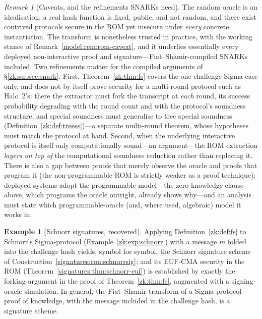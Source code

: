 \documentclass[11pt,a4paper]{article}
\theoremstyle{definition}
\newtheorem{example}[theorem]{Example}
\theoremstyle{remark}
\newtheorem{remark}[theorem]{Remark}
\begin{document}
\begin{remark}[Caveats, and the refinements SNARKs need]
\label{zk:rem:rom-caveats}
The random oracle is an idealisation: a real hash function is fixed,
public, and not random, and there exist contrived protocols secure
in the ROM yet insecure under \emph{every} concrete instantiation.
The transform is nonetheless trusted in practice, with the working
stance of Remark~\ref{model:rem:rom-caveat}, and it underlies
essentially every
deployed non-interactive proof and signature---Fiat--Shamir-compiled
SNARKs included. Two refinements matter for the compiled arguments
of \S\ref{zk:subsec:snark}. First, Theorem~\ref{zk:thm:fs} covers
the one-challenge Sigma case only, and does not by itself prove
security for a multi-round protocol such as Halo~2's: there the
extractor must fork the transcript at \emph{each} round, its
success probability degrading with the round count and with the
protocol's soundness structure, and special soundness must
generalise to tree special soundness
(Definition~\ref{zk:def:treess})---a separate multi-round theorem,
whose hypotheses must match the protocol at hand. Second, when the
underlying interactive protocol is itself only computationally
sound---an argument---the ROM extraction \emph{layers on top of}
the computational soundness reduction rather than replacing it.
There is also a gap between proofs that merely observe the oracle
and proofs that program it (the non-programmable ROM is strictly
weaker as a proof technique); deployed systems adopt the
programmable model---the zero-knowledge clause above, which
programs the oracle outright, already shows why---and an analysis
must state which programmable-oracle (and, where used, algebraic)
model it works in.
\end{remark}

\begin{example}[Schnorr signatures, recovered]
\label{zk:exp:schnorrsig}
Applying Definition~\ref{zk:def:fs} to Schnorr's Sigma-protocol
(Example~\ref{zk:exp:schnorr}) with a message \(m\) folded into the
challenge hash yields, symbol for symbol, the Schnorr signature
scheme of Construction~\ref{signatures:con:schnorrsig}; and its
EUF-CMA security in the ROM
(Theorem~\ref{signatures:thm:schnorr-euf}) is established by exactly
the forking argument in the proof of Theorem~\ref{zk:thm:fs},
augmented with a signing-oracle simulation. In general, the
Fiat--Shamir transform of a Sigma-protocol proof of knowledge, with the
message included in the challenge hash, is a signature scheme.
\end{example}
\end{document}
